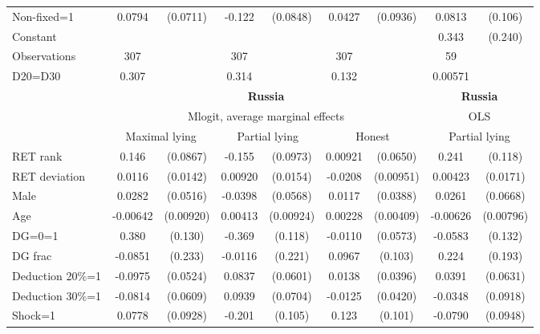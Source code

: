 \begin{tabular}{l|cccccc|cc}
Non-fixed=1     &   0.0794         & (0.0711)&   -0.122         & (0.0848)&   0.0427         & (0.0936)&   0.0813         &  (0.106)\\
Constant        &                  &         &                  &         &                  &         &    0.343         &  (0.240)\\
\hline
Observations    &      307         &         &      307         &         &      307         &         &       59         &         \\
D20=D30         &    0.307         &         &    0.314         &         &    0.132         &         &  0.00571         &         \\
\hline\hline
&\multicolumn{6}{c|}{\bf Russia}&\multicolumn{2}{c}{\bf Russia}\\ &\multicolumn{6}{c|}{Mlogit, average marginal effects }&\multicolumn{2}{c}{OLS}\\
                &\multicolumn{2}{c}{Maximal lying}&\multicolumn{2}{c}{Partial lying}&\multicolumn{2}{c}{Honest}  &\multicolumn{2}{c}{Partial lying}\\
\hline
RET rank        &    0.146\sym{*}  & (0.0867)&   -0.155         & (0.0973)&  0.00921         & (0.0650)&    0.241\sym{**} &  (0.118)\\
RET deviation   &   0.0116         & (0.0142)&  0.00920         & (0.0154)&  -0.0208\sym{**} &(0.00951)&  0.00423         & (0.0171)\\
Male            &   0.0282         & (0.0516)&  -0.0398         & (0.0568)&   0.0117         & (0.0388)&   0.0261         & (0.0668)\\
Age             & -0.00642         &(0.00920)&  0.00413         &(0.00924)&  0.00228         &(0.00409)& -0.00626         &(0.00796)\\
DG=0=1          &    0.380\sym{***}&  (0.130)&   -0.369\sym{***}&  (0.118)&  -0.0110         & (0.0573)&  -0.0583         &  (0.132)\\
DG frac         &  -0.0851         &  (0.233)&  -0.0116         &  (0.221)&   0.0967         &  (0.103)&    0.224         &  (0.193)\\
Deduction 20\%=1&  -0.0975\sym{*}  & (0.0524)&   0.0837         & (0.0601)&   0.0138         & (0.0396)&   0.0391         & (0.0631)\\
Deduction 30\%=1&  -0.0814         & (0.0609)&   0.0939         & (0.0704)&  -0.0125         & (0.0420)&  -0.0348         & (0.0918)\\
Shock=1         &   0.0778         & (0.0928)&   -0.201\sym{*}  &  (0.105)&    0.123         &  (0.101)&  -0.0790         & (0.0948)\\

\end{tabular}
